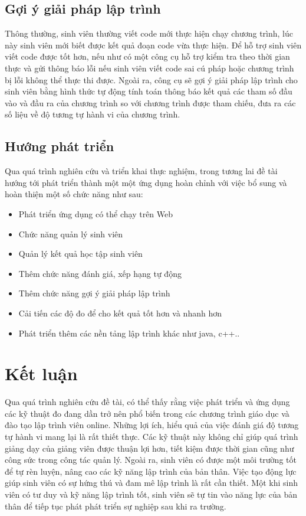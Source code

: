 \subsection{Gợi ý giải pháp lập trình}
Thông thường, sinh viên thường viết code mới thực hiện chạy chương trình, lúc này sinh viên mới biết được kết quả đoạn code vừa thực hiện. Để hỗ trợ sinh viên viết code được tốt hơn, nếu như có một công cụ hỗ trợ kiểm tra theo thời gian thực và gửi thông báo lỗi nếu sinh viên viết code sai cú pháp hoặc chương trình bị lỗi không thể thực thi được. Ngoài ra, công cụ sẽ gợi ý giải pháp lập trình cho sinh viên bằng hình thức tự động tính toán thông báo kết quả các tham số đầu vào và đầu ra của chương trình so với chương trình được tham chiếu, đưa ra các số liệu về độ tương tự hành vi của chương trình.	

\subsection{Hướng phát triển}
Qua quá trình nghiên cứu và triển khai thực nghiệm, trong tương lai đề tài hướng tới phát triển thành một một ứng dụng hoàn chỉnh với việc bổ sung và hoàn thiện một số chức năng như sau:
\begin{itemize}
	\item Phát triển ứng dụng có thể chạy trên Web
	\item Chức năng quản lý sinh viên
	\item Quản lý kết quả học tập sinh viên
	\item Thêm chức năng đánh giá, xếp hạng tự động
	\item Thêm chức năng gợi ý giải pháp lập trình
	\item Cải tiến các độ đo để cho kết quả tốt hơn và nhanh hơn
	\item Phát triển thêm các nền tảng lập trình khác như java, c++..		
\end{itemize}

\section{Kết luận}
Qua quá trình nghiên cứu đề tài, có thể thấy rằng việc phát triển và ứng dụng các kỹ thuật đo đang dần trở nên phổ biến trong các chương trình giáo dục và đào tạo lập trình viên online. Những lợi ích, hiểu quả của việc đánh giá độ tương tự hành vi mang lại là rất thiết thực. Các kỹ thuật này không chỉ giúp quá trình giảng dạy của giảng viên được thuận lợi hơn, tiết kiệm được thời gian cũng như công sức trong công tác quản lý. Ngoài ra, sinh viên có được một môi trường tốt để tự rèn luyện, nâng cao các kỹ năng lập trình của bản thân. Việc tạo động lực giúp sinh viên có sự hứng thú và đam mê lập trình là rất cần thiết. Một khi sinh viên có tư duy và kỹ năng lập trình tốt, sinh viên sẽ tự tin vào năng lực của bản thân để tiếp tục phát phát triển sự nghiệp sau khi ra trường.

